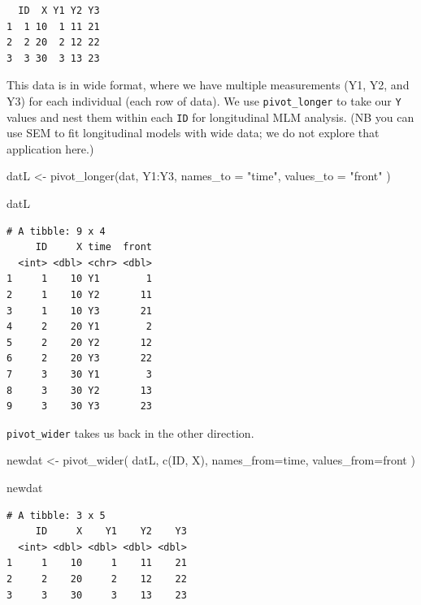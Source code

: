 \documentclass[
  letterpaper,
  DIV=11,
  numbers=noendperiod]{scrreprt}
\newenvironment{Shaded}{\begin{snugshade}}{\end{snugshade}}
\newcommand{\AttributeTok}[1]{\textcolor[rgb]{0.49,0.56,0.16}{#1}}
\newcommand{\FunctionTok}[1]{\textcolor[rgb]{0.02,0.16,0.49}{#1}}
\newcommand{\NormalTok}[1]{\textcolor[rgb]{0.00,0.44,0.13}{#1}}
\newcommand{\OtherTok}[1]{\textcolor[rgb]{0.00,0.44,0.13}{#1}}
\newcommand{\SpecialCharTok}[1]{\textcolor[rgb]{0.25,0.44,0.63}{#1}}
\newcommand{\StringTok}[1]{\textcolor[rgb]{0.25,0.44,0.63}{#1}}
\begin{document}
\begin{verbatim}
  ID  X Y1 Y2 Y3
1  1 10  1 11 21
2  2 20  2 12 22
3  3 30  3 13 23
\end{verbatim}

This data is in wide format, where we have multiple measurements (Y1,
Y2, and Y3) for each individual (each row of data). We use
\texttt{pivot\_longer} to take our \texttt{Y} values and nest them
within each \texttt{ID} for longitudinal MLM analysis. (NB you can use
SEM to fit longitudinal models with wide data; we do not explore that
application here.)

\begin{Shaded}
\begin{Highlighting}[]
\NormalTok{datL }\OtherTok{\textless{}{-}} \FunctionTok{pivot\_longer}\NormalTok{(dat, Y1}\SpecialCharTok{:}\NormalTok{Y3, }
                     \AttributeTok{names\_to =} \StringTok{"time"}\NormalTok{, }
                     \AttributeTok{values\_to =} \StringTok{"front"}\NormalTok{ )}

\NormalTok{datL}
\end{Highlighting}
\end{Shaded}

\begin{verbatim}
# A tibble: 9 x 4
     ID     X time  front
  <int> <dbl> <chr> <dbl>
1     1    10 Y1        1
2     1    10 Y2       11
3     1    10 Y3       21
4     2    20 Y1        2
5     2    20 Y2       12
6     2    20 Y3       22
7     3    30 Y1        3
8     3    30 Y2       13
9     3    30 Y3       23
\end{verbatim}

\texttt{pivot\_wider} takes us back in the other direction.

\begin{Shaded}
\begin{Highlighting}[]
\NormalTok{newdat }\OtherTok{\textless{}{-}} \FunctionTok{pivot\_wider}\NormalTok{( datL, }\FunctionTok{c}\NormalTok{(ID, X), }
                       \AttributeTok{names\_from=}\NormalTok{time, }
                       \AttributeTok{values\_from=}\NormalTok{front  )}

\NormalTok{newdat}
\end{Highlighting}
\end{Shaded}

\begin{verbatim}
# A tibble: 3 x 5
     ID     X    Y1    Y2    Y3
  <int> <dbl> <dbl> <dbl> <dbl>
1     1    10     1    11    21
2     2    20     2    12    22
3     3    30     3    13    23
\end{verbatim}
\end{document}
